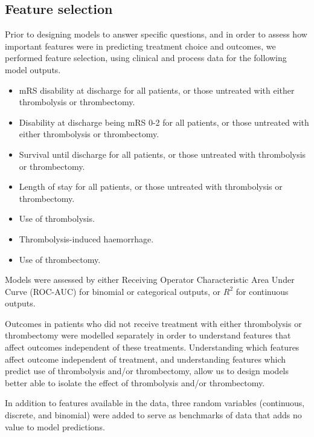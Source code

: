 \subsection{Feature selection}

Prior to designing models to answer specific questions, and in order to assess how important features were in predicting treatment choice and outcomes, we performed feature selection, using clinical and process data for the following model outputs.

\begin{itemize}
    \item mRS disability at discharge for all patients, or those untreated with either thrombolysis or thrombectomy.
    \item Disability at discharge being mRS 0-2 for all patients, or those untreated with either thrombolysis or thrombectomy.
    \item Survival until discharge for all patients, or those untreated with thrombolysis or thrombectomy.
    \item Length of stay for all patients, or those untreated with thrombolysis or thrombectomy.
    \item Use of thrombolysis.
    \item Thrombolysis-induced haemorrhage.
    \item Use of thrombectomy.
\end{itemize}

Models were assessed by either Receiving Operator Characteristic Area Under Curve (ROC-AUC) for binomial or categorical outputs, or $R^2$ for continuous outputs.

Outcomes in patients who did not receive treatment with either thrombolysis or thrombectomy were modelled separately in order to understand features that affect outcomes independent of these treatments. Understanding which features affect outcome independent of treatment, and understanding features which predict use of thrombolysis and/or thrombectomy, allow us to design models better able to isolate the effect of thrombolysis and/or thrombectomy.

In addition to features available in the data, three random variables (continuous, discrete, and binomial) were added to serve as benchmarks of data that adds no value to model predictions.